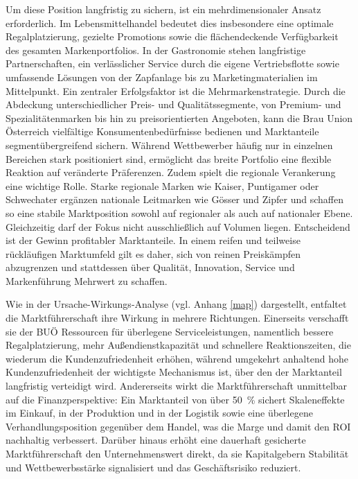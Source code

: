 Um diese Position langfristig zu sichern, ist ein mehrdimensionaler Ansatz erforderlich. Im Lebensmittelhandel bedeutet dies insbesondere eine optimale Regalplatzierung, gezielte Promotions sowie die flächendeckende Verfügbarkeit des gesamten Markenportfolios. In der Gastronomie stehen langfristige Partnerschaften, ein verlässlicher Service durch die eigene Vertriebsflotte sowie umfassende Lösungen von der Zapfanlage bis zu Marketingmaterialien im Mittelpunkt. Ein zentraler Erfolgsfaktor ist die Mehrmarkenstrategie. Durch die Abdeckung unterschiedlicher Preis- und Qualitätssegmente, von Premium- und Spezialitätenmarken bis hin zu preisorientierten Angeboten, kann die Brau Union Österreich vielfältige Konsumentenbedürfnisse bedienen und Marktanteile segmentübergreifend sichern. Während Wettbewerber häufig nur in einzelnen Bereichen stark positioniert sind, ermöglicht das breite Portfolio eine flexible Reaktion auf veränderte Präferenzen. Zudem spielt die regionale Verankerung eine wichtige Rolle. Starke regionale Marken wie Kaiser, Puntigamer oder Schwechater ergänzen nationale Leitmarken wie Gösser und Zipfer und schaffen so eine stabile Marktposition sowohl auf regionaler als auch auf nationaler Ebene. Gleichzeitig darf der Fokus nicht ausschließlich auf Volumen liegen. Entscheidend ist der Gewinn profitabler Marktanteile. In einem reifen und teilweise rückläufigen Marktumfeld gilt es daher, sich von reinen Preiskämpfen abzugrenzen und stattdessen über Qualität, Innovation, Service und Markenführung Mehrwert zu schaffen.

Wie in der Ursache-Wirkungs-Analyse (vgl. Anhang \ref{map}) dargestellt, entfaltet die Marktführerschaft ihre Wirkung in mehrere Richtungen. Einerseits verschafft sie der BUÖ Ressourcen für überlegene Serviceleistungen, namentlich bessere Regalplatzierung, mehr Außendienstkapazität und schnellere Reaktionszeiten, die wiederum die Kundenzufriedenheit erhöhen, während umgekehrt anhaltend hohe Kundenzufriedenheit der wichtigste Mechanismus ist, über den der Marktanteil langfristig verteidigt wird. Andererseits wirkt die Marktführerschaft unmittelbar auf die Finanzperspektive: Ein Marktanteil von über 50~\% sichert Skaleneffekte im Einkauf, in der Produktion und in der Logistik sowie eine überlegene Verhandlungsposition gegenüber dem Handel, was die Marge und damit den ROI nachhaltig verbessert. Darüber hinaus erhöht eine dauerhaft gesicherte Marktführerschaft den Unternehmenswert direkt, da sie Kapitalgebern Stabilität und Wettbewerbsstärke signalisiert und das Geschäftsrisiko reduziert.

